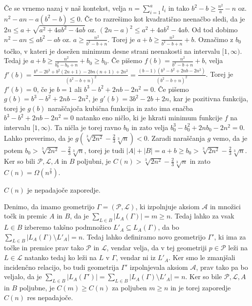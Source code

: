 \documentclass[mat1, tisk]{fmfdelo}
\begin{document}
\begin{dokaz}
        Če se vrnemo nazaj v naš kontekst, velja $n = \sum_{i=1}^{a}l_i$ in tako $b^2 - b \geq \frac{n^2}{a} - n$ oz. $n^2 - an - a(b^2 - b) \leq 0$. Če to razrešimo kot kvadratično neenačbo sledi, da je $2n \leq a + \sqrt{a^2 + 4ab^2 - 4ab}$ oz. $(2n - a)^2 \leq a^2 + 4ab^2 - 4ab$. Od tod dobimo $n^2 - an \leq ab^2 - ab$ oz. $a \geq \frac{n^2}{b^2 - b + n}$.
        Torej je $a + b \geq \frac{n^2}{b^2 - b + n} + b$. Označimo z $b_0$ točko, v kateri je dosežen minimum desne strani neenakosti na intervalu $[1, \infty)$. Tedaj je $a + b \geq \frac{n^2}{b_0^2 - b_0 + n} + b_0 \geq b_0$. Če pišemo $f(b) = \frac{n^2}{b^2 - b + n} + b$, velja $f'(b) = \frac{b^4-2b^3+b^2(2n+1)-2bn(n+1)+2n^2}{(b^2-b+n)^2} = \frac{(b-1)(b^3-b^2+2nb-2n^2)}{(b^2-b+n)^2}$.
        Torej je $f'(b) = 0$, če je $b = 1$ ali $b^3 - b^2 + 2nb - 2n^2 = 0$. Če pišemo $g(b) = b^3 - b^2 + 2nb - 2n^2$, je $g'(b) = 3b^2 - 2b + 2n$, kar je pozitivna funkcija, torej je $g(b)$ naraščajoča kubična funkcija in zato ima enačba $b^3 - b^2 + 2nb - 2n^2 = 0$ natanko eno ničlo, ki je hkrati minimum funkcije $f$ na intervalu $[1, \infty)$.
        Ta ničla je torej ravno $b_0$ in zato velja $b_0^3 - b_0^2 + 2nb_0 - 2n^2 = 0$. Lahko preverimo, da je $g(\sqrt[3]{2n^2} - \frac{2}{3}\sqrt[3]{n}) < 0$. Zaradi naraščanja $g$ vemo, da je potem $b_0 > \sqrt[3]{2n^2} - \frac{2}{3}\sqrt[3]{n}$, torej je tudi $|A| + |B| = a + b \geq b_0 > \sqrt[3]{2n^2} - \frac{2}{3}\sqrt[3]{n}$.
        Ker so bili $\mathcal{P}, \mathcal{L}, A$ in $B$ poljubni, je $C(n) > \sqrt[3]{2n^2} - \frac{2}{3}\sqrt[3]{n}$ in zato $C(n) = \Omega(n^{\frac{2}{3}})$.
    \end{dokaz}

    \begin{trditev}
        $C(n)$ je nepadajoče zaporedje.
    \end{trditev}

    \begin{dokaz}
        Denimo, da imamo geometrijo $\Gamma = (\mathcal{P}, \mathcal{L})$, ki izpolnjuje aksiom $\mathcal{A}$ in množici točk in premic $A$ in $B$, da je $\sum_{L \in B}|L_A(\Gamma)| = m \geq n$. Tedaj lahko za vsak $L \in B$ izberemo takšno podmnožico $L'_A \subseteq L_A(\Gamma)$, da bo $\sum_{L \in B}|L_A(\Gamma)\setminus L'_A| = n$. Tedaj lahko definiramo novo geometrijo $\Gamma'$, ki ima za točke in premice prav
        tako $\mathcal{P}$ in $\mathcal{L}$, vendar velja, da v tej geometriji $p \in \mathcal{P}$ leži na $L \in \mathcal{L}$ natanko tedaj ko leži na $L$ v $\Gamma$, vendar ni iz $L'_A$. Ker smo le zmanjšali incidenčno relacijo, bo tudi geometrija $\Gamma'$ izpolnjevala aksiom $\mathcal{A}$, prav tako pa bo veljalo, da je $\sum_{L \in B}|L_A(\Gamma')| = \sum_{L \in B}|L_A(\Gamma)\setminus L'_A| = n$. 
        Ker so bile $\mathcal{P}, \mathcal{L}, A$ in $B$ poljubne, je $C(m) \geq C(n)$ za poljuben $m \geq n$ in je torej zaporedje $C(n)$ res nepadajoče.
    \end{dokaz}
\end{document}
